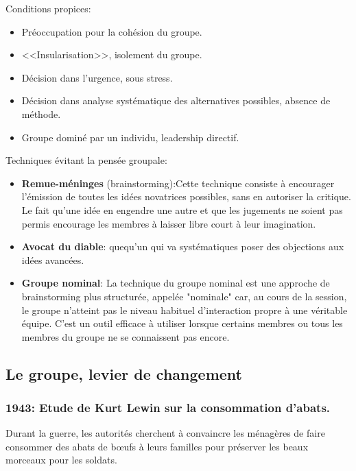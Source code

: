 \documentclass[12pt]{article}
\begin{document}
		Conditions propices:
		\begin{itemize}
		\item Préoccupation pour la cohésion du groupe.
		\item <<Insularisation>>, isolement du groupe.
		\item Décision dans l'urgence, sous stress.
		\item Décision dans analyse systématique des alternatives possibles, absence de méthode.
		\item Groupe dominé par un individu, leadership directif. \newline
		\end{itemize}
		
		Techniques évitant la pensée groupale:
		\begin{itemize}
		\item \textbf{Remue-méninges} (brainstorming):Cette technique consiste à encourager l'émission de toutes les idées novatrices possibles, sans en autoriser la critique. Le fait qu'une idée en engendre une autre et que les jugements ne soient pas permis encourage les membres à laisser libre court à leur imagination.
		\item \textbf{Avocat du diable}: quequ'un qui va systématiques poser des objections aux idées avancées.
		\item \textbf{Groupe nominal}: La  technique  du  groupe  nominal  est une  approche  de  brainstorming  plus  structurée, appelée "nominale" car, au cours de la session, le groupe n'atteint pas le niveau habituel d'interaction propre à une véritable équipe. C'est un outil efficace à utiliser lorsque certains membres ou tous les membres du groupe ne se connaissent pas encore.
		\end{itemize}
		
	\subsection{Le groupe, levier de changement}
	
	\subsubsection*{1943: Etude de Kurt Lewin sur la consommation d'abats.}
	
	Durant la guerre, les autorités cherchent à convaincre les ménagères de faire consommer des abats de b\oe ufs à leurs familles pour préserver les beaux morceaux pour les soldats. \newline
	
\end{document}
